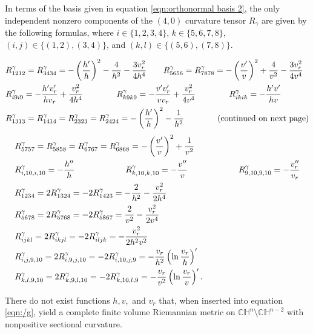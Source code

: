\documentclass[10pt,a4paper]{amsart}
\def\C{\mathbb{C}}
\def\H{\mathbb{H}}
\def\g{\gamma}
\begin{document}
\begin{theorem}\label{thm:curvature tensor 2}
In terms of the basis given in equation \eqref{eqn:orthonormal basis 2}, the only independent nonzero components of the $(4,0)$ curvature tensor $R_{\g}$ are given by the following formulas, where $i \in \{ 1, 2, 3, 4 \}$, $k \in \{ 5, 6, 7, 8 \}$, $( i, j) \in \{ (1, 2), ( 3, 4) \}$, and $(k, l) \in \{ (5, 6), ( 7, 8) \}$.

	\begin{align*}
	&R^{\g}_{1212} = R^{\g}_{3434} = - \left( \frac{h'}{h} \right)^2 - \frac{4}{h^2} - \frac{3 v_r^2}{4h^4}  \hskip 20pt R^{\g}_{5656} = R^{\g}_{7878} = - \left( \frac{v'}{v} \right)^2 + \frac{4}{v^2} - \frac{3v_r^2}{4 v^4}  \\
	&R^{\g}_{i9i9} = - \frac{h' v_r'}{h v_r} + \frac{v_r^2}{4 h^4}   \hskip 40pt	R^{\g}_{k9k9} = - \frac{v' v_r'}{v v_r} + \frac{v_r^2}{4 v^4}	\hskip 40pt	R^{\g}_{ikik} = - \frac{h' v'}{hv}   \\
	&R^{\g}_{1313} = R^{\g}_{1414} = R^{\g}_{2323} = R^{\g}_{2424} = - \left( \frac{h'}{h} \right)^2 - \frac{1}{h^2}  \hskip 40pt	\text{(continued on next page)}
	\end{align*}
	\begin{align*}
	&R^{\g}_{5757} = R^{\g}_{5858} = R^{\g}_{6767} = R^{\g}_{6868} = - \left( \frac{v'}{v} \right)^2 + \frac{1}{v^2}  \\
	&R^{\g}_{i,10,i,10} = - \frac{h''}{h}  \hskip 60pt	R^{\g}_{k,10,k,10} = - \frac{v''}{v} 	\hskip 60pt R^{\g}_{9,10,9,10} = - \frac{v_r''}{v_r}   \\
	&R^{\g}_{1234} = 2R^{\g}_{1324} = -2R^{\g}_{1423} = - \frac{2}{h^2} - \frac{v_r^2}{2h^4}  \\
	&R^{\g}_{5678} = 2R^{\g}_{5768} = -2R^{\g}_{5867} = \frac{2}{v^2} - \frac{v_r^2}{2v^4}  \\
	&R^{\g}_{ijkl} = 2R^{\g}_{ikjl} = -2R^{\g}_{iljk} = - \frac{v_r^2}{2 h^2 v^2}   \\
	&R^{\g}_{i,j,9, 10} = 2R^{\g}_{i,9,j,10} = -2R^{\g}_{i,10,j,9} = - \frac{v_r}{h^2} \left( \ln \frac{v_r}{h} \right)'   \\
	&R^{\g}_{k,l,9,10} = 2R^{\g}_{k,9,l,10} = -2R^{\g}_{k,10,l,9} = - \frac{v_r}{v^2} \left( \ln \frac{v_r}{v} \right)' .
	\end{align*}
\end{theorem}

\begin{lemma}
There do not exist functions $h, v, $ and $v_r$ that, when inserted into equation \eqref{eqn:/g}, yield a complete finite volume Riemannian metric on $\C \H^n \setminus \C \H^{n-2}$ with nonpositive sectional curvature.
\end{lemma}
\end{document}
